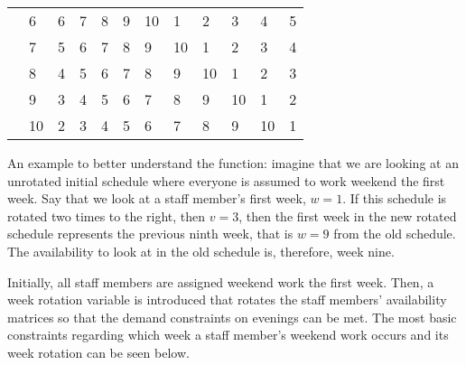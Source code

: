 \begin{table}[H]
\begin{tabular}{llllllllllll}
    & \multicolumn{1}{l|}{6}  & \multicolumn{1}{l|}{6}  & \multicolumn{1}{l|}{7}  & \multicolumn{1}{l|}{8}  & \multicolumn{1}{l|}{9}  & \multicolumn{1}{l|}{10} & \multicolumn{1}{l|}{1}  & \multicolumn{1}{l|}{2}  & \multicolumn{1}{l|}{3}  & \multicolumn{1}{l|}{4}  & \multicolumn{1}{l|}{5}  \\ \cline{3-12} 
    & \multicolumn{1}{l|}{7}  & \multicolumn{1}{l|}{5}  & \multicolumn{1}{l|}{6}  & \multicolumn{1}{l|}{7}  & \multicolumn{1}{l|}{8}  & \multicolumn{1}{l|}{9}  & \multicolumn{1}{l|}{10} & \multicolumn{1}{l|}{1}  & \multicolumn{1}{l|}{2}  & \multicolumn{1}{l|}{3}  & \multicolumn{1}{l|}{4}  \\ \cline{3-12} 
    & \multicolumn{1}{l|}{8}  & \multicolumn{1}{l|}{4}  & \multicolumn{1}{l|}{5}  & \multicolumn{1}{l|}{6}  & \multicolumn{1}{l|}{7}  & \multicolumn{1}{l|}{8}  & \multicolumn{1}{l|}{9}  & \multicolumn{1}{l|}{10} & \multicolumn{1}{l|}{1}  & \multicolumn{1}{l|}{2}  & \multicolumn{1}{l|}{3}  \\ \cline{3-12} 
    & \multicolumn{1}{l|}{9}  & \multicolumn{1}{l|}{3}  & \multicolumn{1}{l|}{4}  & \multicolumn{1}{l|}{5}  & \multicolumn{1}{l|}{6}  & \multicolumn{1}{l|}{7}  & \multicolumn{1}{l|}{8}  & \multicolumn{1}{l|}{9}  & \multicolumn{1}{l|}{10} & \multicolumn{1}{l|}{1}  & \multicolumn{1}{l|}{2}  \\ \cline{3-12} 
    & \multicolumn{1}{l|}{10} & \multicolumn{1}{l|}{2}  & \multicolumn{1}{l|}{3}  & \multicolumn{1}{l|}{4}  & \multicolumn{1}{l|}{5}  & \multicolumn{1}{l|}{6}  & \multicolumn{1}{l|}{7}  & \multicolumn{1}{l|}{8}  & \multicolumn{1}{l|}{9}  & \multicolumn{1}{l|}{10} & \multicolumn{1}{l|}{1}  \\ \cline{3-12} 
\end{tabular}
\end{table}
An example to better understand the function: imagine that we are looking at an unrotated initial schedule where everyone is assumed to work weekend the first week. Say that we look at a staff member's first week, $w=1$. If this schedule is rotated two times to the right, then $v=3$, then the first week in the new rotated schedule represents the previous ninth week, that is $w=9$ from the old schedule. The availability to look at in the old schedule is, therefore, week nine.

Initially, all staff members are assigned weekend work the first week. Then, a week rotation variable is introduced that rotates the staff members' availability matrices so that the demand constraints on evenings can be met. The most basic constraints regarding which week a staff member's weekend work occurs and its week rotation can be seen below.

